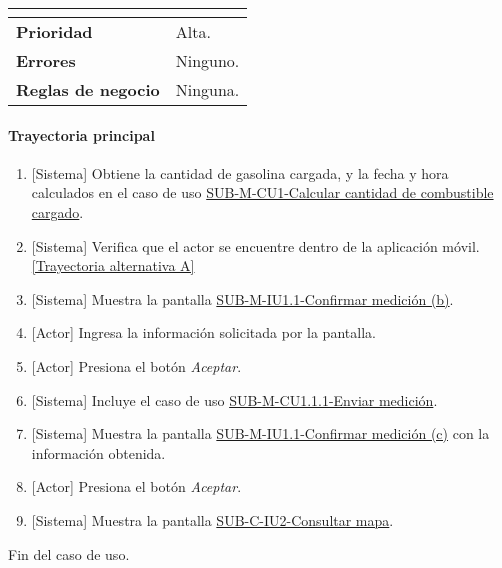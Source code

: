 \begin{longtable}{|J{5cm}|J{10.3cm}|}
\begin{itemize}
		\end{itemize} \\ \hline 
	\textbf{Prioridad} & 
		Alta. \\ \hline
	\textbf{Errores} & Ninguno.
		\\ \hline
	\textbf{Reglas de negocio} & Ninguna.
		 \\ \hline
\end{longtable}

\paragraph{Trayectoria principal}
	\begin{enumerate}
		\item {[Sistema]} Obtiene la cantidad de gasolina cargada, y la fecha y hora calculados en el caso de uso \hyperref[SUB-M-CU1]{SUB-M-CU1-Calcular cantidad de combustible cargado}.
		\item {[Sistema]} Verifica que el actor se encuentre dentro de la aplicación móvil.\hyperref[SUB-M-CU1.1:TA]{[Trayectoria alternativa A]}
		\item \label{SUB-M-CU1.1:Pantalla} {[Sistema]} Muestra la pantalla \hyperref[fig:sub-m-iu1.1.b]{SUB-M-IU1.1-Confirmar medición (b)}.
		\item {[Actor]} Ingresa la información solicitada por la pantalla.
		\item \label{SUB-M-CU1.1:Boton} {[Actor]} Presiona el botón \textit{Aceptar}.
		\item {[Sistema]} Incluye el caso de uso \hyperref[SUB-M-CU1.1.1]{SUB-M-CU1.1.1-Enviar medición}.
		\item \label{SUB-M-CU1.1:PantallaFinal} {[Sistema]} Muestra la pantalla \hyperref[fig:sub-m-iu1.1.c]{SUB-M-IU1.1-Confirmar medición (c)} con la información obtenida.
		\item {[Actor]} Presiona el botón \textit{Aceptar}.
		\item {[Sistema]} Muestra la pantalla \hyperref[fig:sub-c-iu2]{SUB-C-IU2-Consultar mapa}.
	\end{enumerate}
	Fin del caso de uso.

